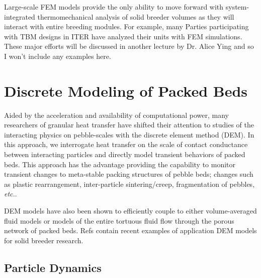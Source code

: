 \documentclass[11pt]{report} %
\begin{document}
Large-scale FEM models provide the only ability to move forward with system-integrated thermomechanical analysis of solid breeder volumes as they will interact with entire breeding modules. For example, many Parties participating with TBM designs in ITER have analyzed their units with FEM simulations. These major efforts will be discussed in another lecture by Dr. Alice Ying and so I won't include any examples here.


\section{Discrete Modeling of Packed Beds}
Aided by the acceleration and availability of computational power, many researchers of granular heat transfer have shifted their attention to studies of the interacting physics on pebble-scales with the discrete element method (DEM). In this approach, we interrogate heat transfer on the scale of contact conductance between interacting particles and directly model transient behaviors of packed beds. This approach has the advantage providing the capability to monitor transient changes to meta-stable packing structures of pebble beds; changes such as plastic rearrangement, inter-particle sintering/creep, fragmentation of pebbles, \textit{etc.}.

DEM models have also been shown to efficiently couple to either volume-averaged fluid models or models of the entire tortuous fluid flow through the porous network of packed beds. Refs\cite{Annabattula2011,Lu2000b,An20072233,gan20072233,VanLew2014,VanLew2015} contain recent examples of application DEM models for solid breeder research.



\subsection{Particle Dynamics}\label{sec:particle-dynamics}
\end{document}
